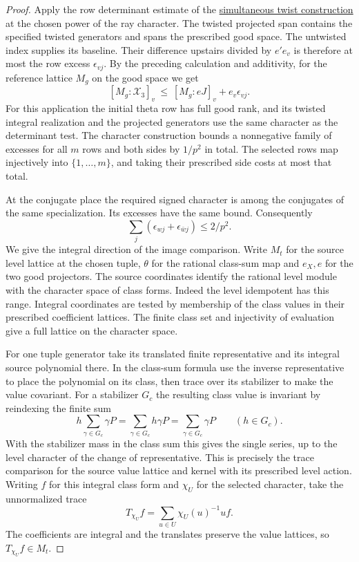 \begin{proof}
Apply the row determinant estimate of
the \hyperref[subsec:retained-twist]{simultaneous twist construction} at the chosen power of the
ray character. The twisted projected span contains the
specified twisted generators and spans the prescribed good
space. The untwisted index supplies its baseline. Their
difference upstairs divided by \(e'e_v\) is therefore at
most the row excess \(\epsilon_{vj}\). By the preceding
calculation and additivity, for the reference lattice \(M_g\)
on the good space we get
\begin{equation}\label{eq:paired-twisted-row-length}
 [M_g:\mathcal X_3]_v\ \le\ [M_g:eJ]_v+e_v\epsilon_{vj}.
\end{equation}
For this application the initial theta row has full good
rank, and its twisted integral realization and the projected generators use the same character as the determinant test.
The character construction bounds a nonnegative family of
excesses for all \(m\) rows and both sides by \(1/p^2\)
in total. The selected rows map injectively into
\(\{1,\ldots,m\}\), and taking their prescribed side
costs at most that total.

At the conjugate place the
required signed character is among the conjugates of the same specialization. Its excesses have the same
bound. Consequently
\[
             \sum_j(\epsilon_{wj}+\epsilon_{\bar wj})\le 2/p^2 .
\]
We give the integral direction of the image comparison.
Write \(M_t\) for the source level lattice at the chosen tuple,
\(\theta\) for the rational class-sum map and \(e_X,e\) for
the two good projectors. The source coordinates identify the
rational level module with the character space of class forms.
Indeed the level idempotent has this range. Integral
coordinates are tested by membership of the class values in
their prescribed coefficient lattices. The finite class set
and injectivity of evaluation give a full lattice on the
character space.

For one tuple generator take its translated finite representative
and its integral source polynomial there. In the class-sum
formula use the inverse representative to place the polynomial
on its class, then trace over its stabilizer to make the value
covariant.
For a stabilizer \(G_c\) the resulting class value is invariant by reindexing the finite sum
\[
  h\sum_{\gamma\in G_c}\gamma P=\sum_{\gamma\in G_c}h\gamma P=\sum_{\gamma\in G_c}\gamma P\qquad(h\in G_c).
\]
 With the stabilizer mass in the class sum this gives
the single series, up to the level character of the change of
representative. This is precisely the trace comparison for
the source value lattice and kernel with its prescribed level
action. Writing \(f\) for this integral class form and \(\chi_U\)
for the selected character, take the unnormalized trace
\[
       T_{\chi_U} f=\sum_{u\in U}\chi_U(u)^{-1}u f .
\]
The coefficients are integral and the translates preserve
the value lattices, so \(T_{\chi_U}f\in M_t\).


\end{proof}
